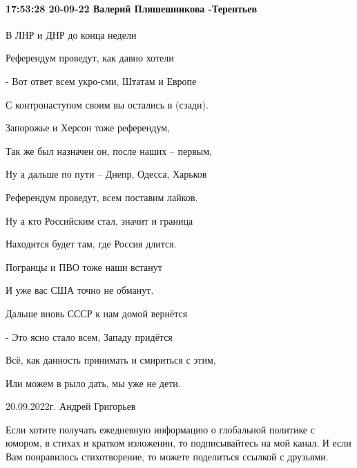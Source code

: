 
 
 
 
 

\paragraph{17:53:28 20-09-22 Валерий Пляшешникова -Терентьев}

В ЛНР и ДНР до конца недели

Референдум проведут, как давно хотели

- Вот ответ всем укро-сми, Штатам и Европе

С контронаступом своим вы остались в (сзади).

Запорожье и Херсон тоже референдум,

Так же был назначен он, после наших – первым,

Ну а дальше по пути – Днепр, Одесса, Харьков

Референдум проведут, всем поставим лайков.

Ну а кто Российским стал, значит и граница

Находится будет там, где Россия длится.

Погранцы и ПВО тоже наши встанут

И уже вас США точно не обманут.

Дальше вновь СССР к нам домой вернётся

- Это ясно стало всем, Западу придётся

Всё, как данность принимать и смириться с этим,

Или можем в рыло дать, мы уже не дети.

20.09.2022г. Андрей Григорьев

Если хотите получать ежедневную информацию о глобальной политике с юмором, в стихах и кратком изложении, то подписывайтесь на мой канал. И если Вам понравилось стихотворение, то можете поделиться ссылкой с друзьями.
